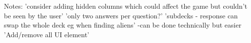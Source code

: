 Notes:
'consider adding hidden columns which could affect the game but couldn't be seen by the user'
'only two answers per question?'
'subdecks - response can swap the whole deck eg when finding aliens'
    -can be done technically but easier
'Add/remove all UI element'